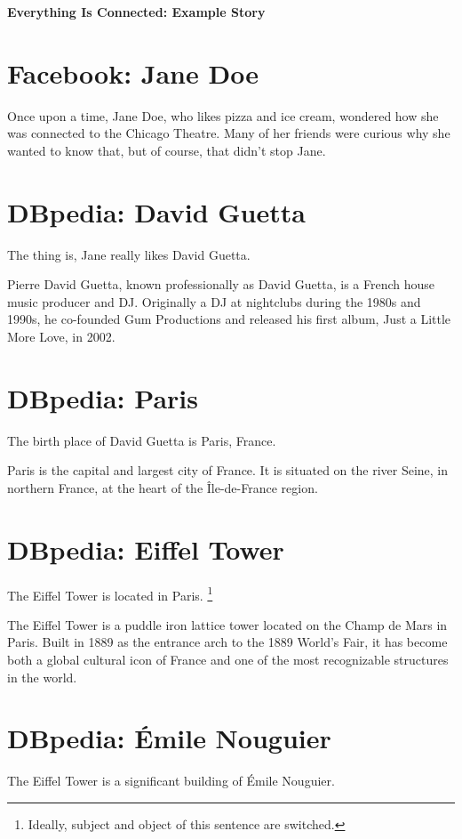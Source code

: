 \documentclass{article}
\begin{document}
{\Large\bf Everything Is Connected: Example Story}

\section{Facebook: Jane Doe}
Once upon a time,
Jane Doe,
who likes pizza and ice cream,
wondered how she was connected to the Chicago Theatre.
Many of her friends were curious
why she wanted to know that,
but of course, that didn't stop
Jane.

\section{DBpedia: David Guetta}
The thing is,
Jane really likes David Guetta.

Pierre David Guetta, known professionally as David Guetta, is a French house music producer and DJ. Originally a DJ at nightclubs during the 1980s and 1990s, he co-founded Gum Productions and released his first album, Just a Little More Love, in 2002.

\section{DBpedia: Paris}
The birth place of David Guetta is Paris, France.

Paris is the capital and largest city of France. It is situated on the river Seine, in northern France, at the heart of the Île-de-France region.

\section{DBpedia: Eiffel Tower}
The Eiffel Tower is located in Paris.%
\footnote{Ideally, subject and object of this sentence are switched.}

The Eiffel Tower is a puddle iron lattice tower located on the Champ de Mars in Paris. Built in 1889 as the entrance arch to the 1889 World's Fair, it has become both a global cultural icon of France and one of the most recognizable structures in the world.

\section{DBpedia: Émile Nouguier}
The Eiffel Tower is a significant building of Émile Nouguier.
\end{document}
